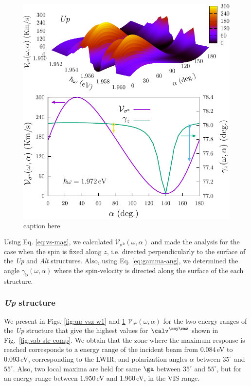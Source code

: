 \documentclass[prb,11pt,tightenlines,twocolumn,aps]{revtex4-1}
\begin{document}
\begin{figure}[t]
    \centering
    \includegraphics[width=\linewidth]{upplots/up-vsz-w2}
    \caption{caption here}
    \label{fig:up-vsz-w2}
\end{figure}


Using Eq. \eqref{eq:vs-mag}, we calculated $\mathcal{V}_{\sigma^{\mathrm{b}}}
(\omega,\alpha)$ and made the analysis for the case when the spin is fixed
along $z$, i.e. directed perpendicularly to the surface of the \emph{Up} and
\emph{Alt} structures. Also, using Eq. \eqref{eq:gamma-ang}, we determined the
angle $\gamma_{\mathrm{b}}(\omega,\alpha)$ where the spin-velocity is directed
along the surface of the each structure.
% 

\subsubsection{\emph{Up} structure}\label{up:fs}

We present in Figs. \ref{fig:up-vsz-w1} and \ref{fig:up-vsz-w2}
$\mathcal{V}_{\sigma^{\mathrm{z}}} (\omega,\alpha)$ for the two energy ranges
of the \emph{Up} structure that give the highest values for $\calv^{\rmy\rmz}$
shown in Fig.~\ref{fig:vab-str-comp}.
% 
We obtain that the zone where the maximum response is reached corresponds to a
energy range of the incident beam from 0.084\,eV to 0.093\,eV, corresponding to
the LWIR, and polarization angles $\alpha$ between $35^{\circ}$ and
$55^{\circ}$. Also,  two local maxima are held for same $\ga$ between
$35^{\circ}$ and $55^{\circ}$, but for an energy range between 1.950\,eV and
1.960\,eV, in the VIS range.
\end{document}
